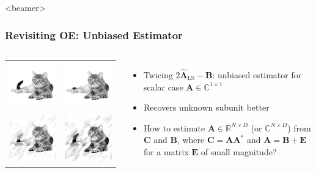 \documentclass{beamer}
\newcommand{\bE}{\boldsymbol{E}}
\newcommand{\bC}{\boldsymbol{C}}
\def\bA{\boldsymbol{A}}
\def\bB{\boldsymbol{B}}
\begin{document}
\begin{frame}<beamer>
\frametitle{Revisiting OE: Unbiased Estimator}
 \begin{columns}
\centering
\begin{tabular}{cc}
\includegraphics[width=0.35\linewidth]{figures/cat.png}
&\includegraphics[width=0.35\linewidth]{figures/cat_tail.png}\\
\includegraphics[width=0.35\linewidth]{figures/cat_t1.png}
&\includegraphics[width=0.35\linewidth]{figures/cat_t2.png}\\
\end{tabular}
\begin{itemize}
\item Twicing $2\hat{\bA}_{\text{LS}}-\bB$: unbiased estimator for scalar case $\bA\in\mathbb{C}^{1\times 1}$
\item Recovers unknown subunit better 
\item How to estimate
$\bA \in\mathbb{R}^{N\times D}$ (or $\mathbb{C}^{N\times D}$) from $\bC$ and
$\bB$, where $\bC=\bA \bA^*$ and $\bA=\bB+\bE$ for a matrix $\bE$ of small
magnitude?
\end{itemize}
\end{columns}
\end{frame}
\end{document}
